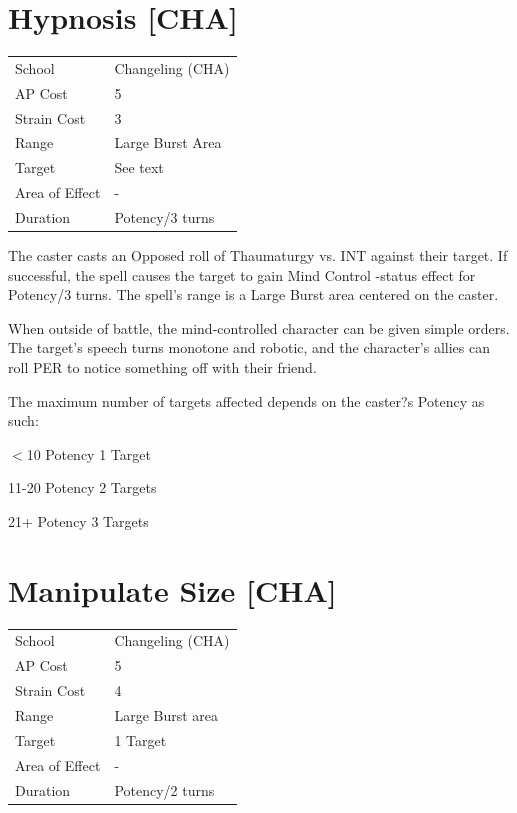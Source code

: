 \documentclass[11pt,a4paper,twocolumn]{book}
\begin{document}
		\section*{Hypnosis [CHA]}
	{
		\begin{tabu} to 75mm{| X[l,4] | X[l,7] |}
			\hline
			School 			&  	Changeling (CHA)\\
			AP Cost	      	&  5				\\
			Strain Cost     &  3				\\
			Range     		&  Large Burst Area	\\
			Target      	&  See text			\\
			Area of Effect  &  -	 			\\
			Duration     	&  Potency/3 turns	\\ \hline
		\end{tabu}
		
	}
	
	\medskip
	
	The caster casts an Opposed roll of Thaumaturgy vs. INT against their target. If successful, the spell causes the target to gain Mind Control -status effect for Potency/3 turns. The spell's range is a Large Burst area centered on the caster. 
	
	When outside of battle, the mind-controlled character can be given simple orders. The target's speech turns monotone and robotic, and the character's allies can roll PER to notice something off with their friend.
	
	The maximum number of targets affected depends on the caster?s Potency as such:
	
	\begin{compactitem}
		\item $<$10 Potency 		1 Target
		\item 11-20 Potency 		2 Targets
		\item 21+ Potency 			3 Targets  
	\end{compactitem}
	
			\section*{Manipulate Size [CHA]}
	{
		\begin{tabu} to 75mm{| X[l,4] | X[l,7] |}
			\hline
			School 			&  	Changeling (CHA)\\
			AP Cost	      	&  5				\\
			Strain Cost     &  4				\\
			Range     		&  Large Burst area	\\
			Target      	&  1 Target			\\
			Area of Effect  &  -	 			\\
			Duration     	&  Potency/2 turns	\\ \hline
		\end{tabu}
		
	}
	
\end{document}
